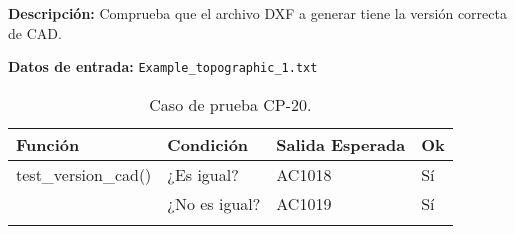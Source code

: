 \textbf{Descripción:} Comprueba que el archivo DXF a generar tiene la versión correcta de CAD.

\textbf{Datos de entrada:} \texttt{Example\_topographic\_1.txt}


\begin{longtable}[]{@{}llll@{}}
\toprule
\begin{minipage}[b]{0.5\columnwidth}\raggedright\strut
Función\strut
\end{minipage} & \begin{minipage}[b]{0.20\columnwidth}\raggedright\strut
Condición\strut
\end{minipage} & \begin{minipage}[b]{0.15\columnwidth}\raggedright\strut
Salida Esperada\strut
\end{minipage} & \begin{minipage}[b]{0.05\columnwidth}\raggedright\strut
Ok\strut
\end{minipage}\tabularnewline
\midrule
\endhead
\begin{minipage}[t]{0.5\columnwidth}\raggedright\strut
\small{test\_version\_cad()}\strut
\end{minipage} & \begin{minipage}[t]{0.20\columnwidth}\raggedright\strut
¿Es igual?\strut
\end{minipage} & \begin{minipage}[t]{0.15\columnwidth}\raggedright\strut
AC1018\strut
\end{minipage} & \begin{minipage}[t]{0.05\columnwidth}\raggedright\strut
Sí\strut
\end{minipage}\tabularnewline
\begin{minipage}[t]{0.5\columnwidth}\raggedright\strut
\strut
\end{minipage} & \begin{minipage}[t]{0.20\columnwidth}\raggedright\strut
¿No es igual?\strut
\end{minipage} & \begin{minipage}[t]{0.15\columnwidth}\raggedright\strut
AC1019\strut
\end{minipage} & \begin{minipage}[t]{0.05\columnwidth}\raggedright\strut
Sí\strut
\end{minipage}\tabularnewline

\bottomrule
\caption{Caso de prueba CP-20.}
\end{longtable}